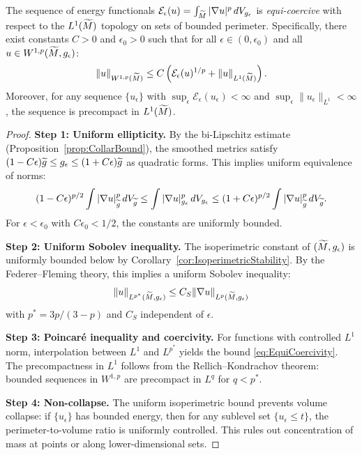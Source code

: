\begin{lemma}\label{lem:EquiCoercivity}
The sequence of energy functionals $\mathcal{E}_\epsilon(u) = \int_{\widetilde{M}} |\nabla u|^p \, dV_{g_{\epsilon}}$ is \emph{equi-coercive} with respect to the $L^1(\widetilde{M})$ topology on sets of bounded perimeter. Specifically, there exist constants $C > 0$ and $\epsilon_0 > 0$ such that for all $\epsilon \in (0, \epsilon_0)$ and all $u \in W^{1,p}(\widetilde{M}, g_{\epsilon})$:
\begin{equation}\label{eq:EquiCoercivity}
    \|u\|_{W^{1,p}(\widetilde{M})} \le C \left( \mathcal{E}_\epsilon(u)^{1/p} + \|u\|_{L^1(\widetilde{M})} \right).
\end{equation}
Moreover, for any sequence $\{u_\epsilon\}$ with $\sup_\epsilon \mathcal{E}_\epsilon(u_\epsilon) < \infty$ and $\sup_\epsilon \|u_\epsilon\|_{L^1} < \infty$, the sequence is precompact in $L^1(\widetilde{M})$.
\end{lemma}
\begin{proof}
\textbf{Step 1: Uniform ellipticity.} By the bi-Lipschitz estimate (Proposition~\ref{prop:CollarBound}), the smoothed metrics satisfy $(1-C\epsilon)\widetilde{g} \le g_{\epsilon} \le (1+C\epsilon)\widetilde{g}$ as quadratic forms. This implies uniform equivalence of norms:
\[
    (1-C\epsilon)^{p/2} \int |\nabla u|_{\widetilde{g}}^p \, dV_{\widetilde{g}} \le \int |\nabla u|_{g_{\epsilon}}^p \, dV_{g_{\epsilon}} \le (1+C\epsilon)^{p/2} \int |\nabla u|_{\widetilde{g}}^p \, dV_{\widetilde{g}}.
\]
For $\epsilon < \epsilon_0$ with $C\epsilon_0 < 1/2$, the constants are uniformly bounded.

\textbf{Step 2: Uniform Sobolev inequality.} The isoperimetric constant of $(\widetilde{M}, g_{\epsilon})$ is uniformly bounded below by Corollary~\ref{cor:IsoperimetricStability}. By the Federer--Fleming theory, this implies a uniform Sobolev inequality:
\[
    \|u\|_{L^{p^*}(\widetilde{M}, g_{\epsilon})} \le C_S \|\nabla u\|_{L^p(\widetilde{M}, g_{\epsilon})}
\]
with $p^* = 3p/(3-p)$ and $C_S$ independent of $\epsilon$.

\textbf{Step 3: Poincar\'e inequality and coercivity.} For functions with controlled $L^1$ norm, interpolation between $L^1$ and $L^{p^*}$ yields the bound \eqref{eq:EquiCoercivity}. The precompactness in $L^1$ follows from the Rellich--Kondrachov theorem: bounded sequences in $W^{1,p}$ are precompact in $L^q$ for $q < p^*$.

\textbf{Step 4: Non-collapse.} The uniform isoperimetric bound prevents volume collapse: if $\{u_\epsilon\}$ has bounded energy, then for any sublevel set $\{u_\epsilon \le t\}$, the perimeter-to-volume ratio is uniformly controlled. This rules out concentration of mass at points or along lower-dimensional sets.
\end{proof}

